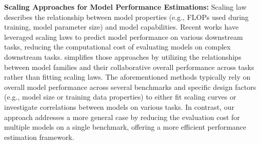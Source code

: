 \textbf{Scaling Approaches for Model Performance Estimations:} 
Scaling law describes the relationship between model properties (e.g., FLOPs used during training, model parameter size) and model capabilities. 
Recent works \citep{hu2023predicting, ruan2024observational, isik2024scaling} have leveraged scaling laws to predict model performance on various downstream tasks, reducing the computational cost of evaluating models on complex downstream tasks. \cite{zhang2024collaborative} simplifies those approaches by utilizing the relationships between model families and their collaborative overall performance across tasks rather than fitting scaling laws. The aforementioned methods typically rely on overall model performance across several benchmarks and specific design factors (e.g., model size or training data properties) to either fit scaling curves or investigate correlations between models on various tasks. In contrast, our approach addresses a more general case by reducing the evaluation cost for multiple models on a single benchmark, offering a more efficient performance estimation framework.

